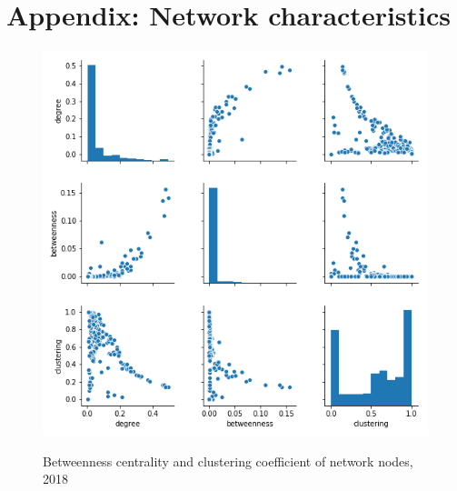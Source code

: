\section{Appendix: Network characteristics}
\label{app: Network characteristics}
\begin{figure}[H]
  \centering
  \caption{Betweenness centrality and clustering coefficient of network nodes, 2018}
    \includegraphics[width=1 \textwidth]{Exam/Figures/NxPairPlot.png}
  \label{fig:Btwns_CC}
\end{figure}